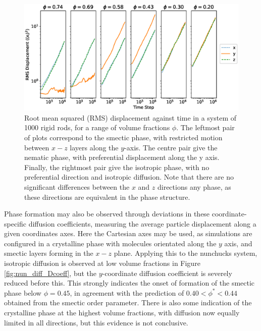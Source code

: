 \documentclass[11pt, a4paper]{article} %
\begin{document}
\begin{figure} [h!]
	\centering
	\includegraphics[width=\linewidth]{Figures/nun_diff_rmsplots}
	\caption{Root mean squared (RMS) displacement against time in a system of 1000 rigid rods, for a range of volume fractions $\phi$. The leftmost pair of plots correspond to the smectic phase, with restricted motion between $x-z$ layers along the $y$-axis. The centre pair give the nematic phase, with preferential displacement along the y axis. Finally, the rightmost pair give the isotropic phase, with no preferential direction and isotropic diffusion. Note that there are no significant differences between the $x$ and $z$ directions any phase, as these directions are equivalent in the phase structure.}
	\label{fig:nun_diff_rmsplots}
\end{figure}  %

Phase formation may also be observed through deviations in these coordinate-specific diffusion coefficients, measuring the average particle displacement along a given coordinates axes. Here the Cartesian axes may be used, as simulations are configured in a crystalline phase with molecules orientated along the $y$ axis, and smectic layers forming in the $x-z$ plane. Applying this to the nunchucks system, isotropic diffusion is observed at low volume fractions in Figure \ref{fig:nun_diff_Dcoeff}, but the $y$-coordinate diffusion coefficient is severely reduced before this. This strongly indicates the onset of formation of the smectic phase below $\phi = 0.45$, in agreement with the prediction of $ 0.40<\phi^{*}<0.44$ obtained from the smectic order parameter. There is also some indication of the crystalline phase at the highest volume fractions, with diffusion now equally limited in all directions, but this evidence is not conclusive.
\end{document}
